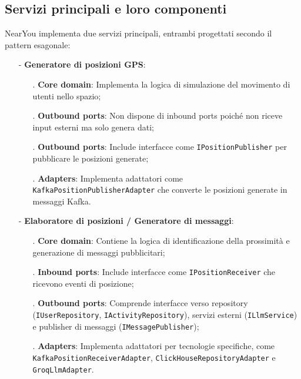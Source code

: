 \documentclass[10pt]{article}
\begin{document}
    \subsection{Servizi principali e loro componenti}
    
    NearYou implementa due servizi principali, entrambi progettati secondo il pattern esagonale:

    \begin{itemize}
        \item[-] \textbf{Generatore di posizioni GPS}:
        \begin{itemize}
            \item[.] \textbf{Core domain}: Implementa la logica di simulazione del movimento di utenti nello spazio;
            \item[.] \textbf{Outbound ports}: Non dispone di inbound ports poiché non riceve input esterni ma solo genera dati;
            \item[.] \textbf{Outbound ports}: Include interfacce come \texttt{IPositionPublisher} per pubblicare le posizioni generate;
            \item[.] \textbf{Adapters}: Implementa adattatori come \texttt{KafkaPositionPublisherAdapter} che converte le posizioni generate in messaggi Kafka.
        \end{itemize}
        
        \item[-] \textbf{Elaboratore di posizioni / Generatore di messaggi}:
        \begin{itemize}
            \item[.] \textbf{Core domain}: Contiene la logica di identificazione della prossimità e generazione di messaggi pubblicitari;
            \item[.] \textbf{Inbound ports}: Include interfacce come \texttt{IPositionReceiver} che ricevono eventi di posizione;
            \item[.] \textbf{Outbound ports}: Comprende interfacce verso repository (\texttt{IUserRepository}, \texttt{IActivityRepository}), servizi esterni (\texttt{ILlmService}) e publisher di messaggi (\texttt{IMessagePublisher});
            \item[.] \textbf{Adapters}: Implementa adattatori per tecnologie specifiche, come \texttt{KafkaPositionReceiverAdapter}, \texttt{ClickHouseRepositoryAdapter} e \texttt{GroqLlmAdapter}.
        \end{itemize}
    \end{itemize}
    
\end{document}
